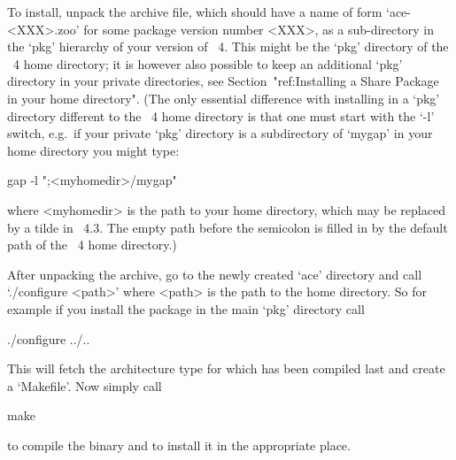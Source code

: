 


To install, unpack the archive file, which should have a name of  form
`ace-<XXX>.zoo'  for  some  package  version  number   <XXX>,   as   a
sub-directory in the `pkg' hierarchy of your version of {\GAP}~4. This
might be the `pkg' directory of the {\GAP}~4  home  directory;  it  is
however also possible to keep an additional `pkg'  directory  in  your
private directories, see Section~"ref:Installing a  Share  Package  in
your home directory". (The only essential difference  with  installing
{\ACE} in a `pkg' directory different to the {\GAP}~4  home  directory
is that one must start {\GAP}  with  the  `-l'  switch,  e.g.~if  your
private `pkg' directory is a subdirectory  of  `mygap'  in  your  home
directory you might type:

gap -l ";<myhomedir>/mygap"

where <myhomedir> is the path to your home  directory,  which  may  be
replaced by a tilde in {\GAP}~4.3. The empty path before the semicolon
is filled in by the default path of the {\GAP}~4 home directory.)

After unpacking the archive, go to the newly created  `ace'  directory
and call `./configure <path>' where <path> is the path to  the  {\GAP}
home directory. So for example if you install the package in the  main
`pkg' directory call

\begintt
./configure ../..
\endtt

This  will fetch  the  architecture  type for  which  {\GAP} has  been
compiled last and create a `Makefile'. Now simply call

\begintt
make
\endtt

to compile the binary and to install it in the appropriate place.

